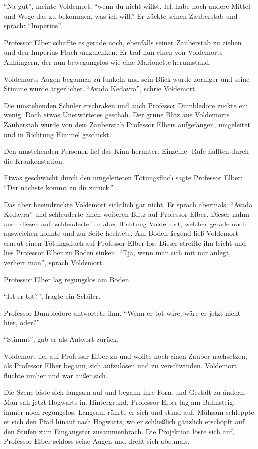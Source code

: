 \enquote{Na gut}, meinte Voldemort, \enquote{wenn du nicht willst. Ich habe noch andere Mittel und Wege das zu bekommen, was ich will.} Er zückte seinen Zauberstab und sprach: \enquote{Imperius}.

Professor Elber schaffte es gerade noch, ebenfalls seinen Zauberstab zu ziehen und den Imperius-Fluch umzulenken. Er traf nun einen von Voldemorts Anhängern, der nun bewegungslos wie eine Marionette herumstand.

Voldemorts Augen begannen zu funkeln und sein Blick wurde zorniger und seine Stimme wurde ärgerlicher. \enquote{Avada Kedavra}, schrie Voldemort.

Die umstehenden Schüler erschraken und auch Professor Dumbledore zuckte ein wenig. Doch etwas Unerwartetes geschah. Der grüne Blitz aus Voldemorts Zauberstab wurde von dem Zauberstab Professor Elbers aufgefangen, umgeleitet und in Richtung Himmel geschickt.

Den umstehenden Personen fiel das Kinn herunter. Einzelne -Rufe hallten durch die Krankenstation.

Etwas geschwächt durch den umgeleiteten Tötungsfluch sagte Professor Elber: \enquote{Der nächste kommt zu dir zurück.}

Das aber beeindruckte Voldemort sichtlich gar nicht. Er sprach abermals: \enquote{Avada Kedavra} und schleuderte einen weiteren Blitz auf Professor Elber. Dieser nahm auch diesen auf, schleuderte ihn aber Richtung Voldemort, welcher gerade noch ausweichen konnte und zur Seite hechtete. Am Boden liegend ließ Voldemort erneut einen Tötungsfluch auf Professor Elber los. Dieser streifte ihn leicht und lies Professor Elber zu Boden sinken. \enquote{Tja, wenn man sich mit mir anlegt, verliert man}, sprach Voldemort.

Professor Elber lag regungslos am Boden.

\enquote{Ist er tot?}, fragte ein Schüler.

Professor Dumbledore antwortete ihm. \enquote{Wenn er tot wäre, wäre er jetzt nicht hier, oder?}

\enquote{Stimmt}, gab er als Antwort zurück.

Voldemort lief auf Professor Elber zu und wollte noch einen Zauber nachsetzen, als Professor Elber begann, sich aufzulösen und zu verschwinden. Voldemort fluchte umher und war außer sich.

Die Szene löste sich langsam auf und begann ihre Form und Gestalt zu ändern. Man sah jetzt Hogwarts im Hintergrund. Professor Elber lag am Bahnsteig; immer noch regungslos. Langsam rührte er sich und stand auf. Mühsam schleppte er sich den Pfad hinauf nach Hogwarts, wo er schließlich gänzlich erschöpft auf den Stufen zum Eingangstor zusammenbrach. Die Projektion löste sich auf, Professor Elber schloss seine Augen und dreht sich abermals.

